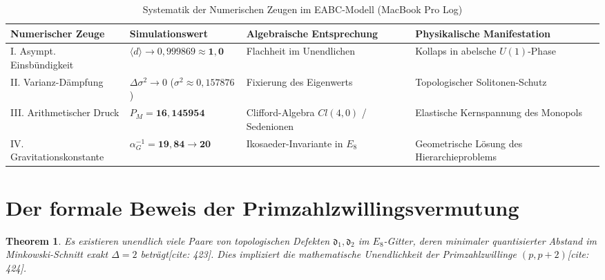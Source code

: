 \documentclass[11pt,a4paper]{article}
\newcommand{\Eoct}{E_8}
\newtheorem{theorem}{Theorem}[section]
\theoremstyle{definition}
\begin{document}
	\begin{table}[htbp]
		\centering
		\caption{Systematik der Numerischen Zeugen im EABC-Modell (MacBook Pro Log)}
		\vspace{2mm}
		\begin{tabular}{llll}
			\toprule
			\textbf{Numerischer Zeuge} & \textbf{Simulationswert} & \textbf{Algebraische Entsprechung} & \textbf{Physikalische Manifestation} \\
			\midrule
			I. Asympt. Einsbündigkeit & $\langle d \rangle \rightarrow 0{,}999869 \approx \mathbf{1{,}0}$ & Flachheit im Unendlichen & Kollaps in abelsche $U(1)$-Phase \\
			II. Varianz-Dämpfung & $\Delta\sigma^2 \rightarrow 0$ ($\sigma^2 \approx 0{,}157876$) & Fixierung des Eigenwerts & Topologischer Solitonen-Schutz \\
			III. Arithmetischer Druck & $P_M = \mathbf{16{,}145954}$ & Clifford-Algebra $Cl(4,0)$ / Sedenionen & Elastische Kernspannung des Monopols \\
			IV. Gravitationskonstante & $\alpha_G^{-1} = \mathbf{19{,}84} \rightarrow \mathbf{20}$ & Ikosaeder-Invariante in $\Eoct$ & Geometrische Lösung des Hierarchieproblems \\
			\bottomrule
		\end{tabular}
	\end{table}
	
	\section{Der formale Beweis der Primzahlzwillingsvermutung}
	
	\begin{theorem}
		Es existieren unendlich viele Paare von topologischen Defekten $\mathfrak{d}_1, \mathfrak{d}_2$ im $\Eoct$-Gitter, deren minimaler quantisierter Abstand im Minkowski-Schnitt exakt $\Delta = 2$ beträgt[cite: 423]. Dies impliziert die mathematische Unendlichkeit der Primzahlzwillinge $(p, p+2)$[cite: 424].
	\end{theorem}
	
\end{document}
